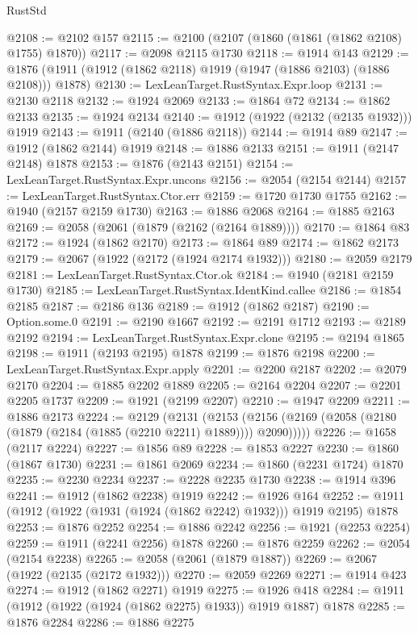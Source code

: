 \begin{lexlean}{RustStd}
\begin{coremodule}
@2108 := @2102 @157
@2115 := @2100 (@2107 (@1860 (@1861 (@1862 @2108) @1755) @1870))
@2117 := @2098 @2115 @1730
@2118 := @1914 @143
@2129 := @1876 (@1911 (@1912 (@1862 @2118) @1919 (@1947 (@1886 @2103) (@1886 @2108))) @1878)
@2130 := LexLeanTarget.RustSyntax.Expr.loop
@2131 := @2130 @2118
@2132 := @1924 @2069
@2133 := @1864 @72
@2134 := @1862 @2133
@2135 := @1924 @2134
@2140 := @1912 (@1922 (@2132 (@2135 @1932))) @1919
@2143 := @1911 (@2140 (@1886 @2118))
@2144 := @1914 @89
@2147 := @1912 (@1862 @2144) @1919
@2148 := @1886 @2133
@2151 := @1911 (@2147 @2148) @1878
@2153 := @1876 (@2143 @2151)
@2154 := LexLeanTarget.RustSyntax.Expr.uncons
@2156 := @2054 (@2154 @2144)
@2157 := LexLeanTarget.RustSyntax.Ctor.err
@2159 := @1720 @1730 @1755
@2162 := @1940 (@2157 @2159 @1730)
@2163 := @1886 @2068
@2164 := @1885 @2163
@2169 := @2058 (@2061 (@1879 (@2162 (@2164 @1889))))
@2170 := @1864 @83
@2172 := @1924 (@1862 @2170)
@2173 := @1864 @89
@2174 := @1862 @2173
@2179 := @2067 (@1922 (@2172 (@1924 @2174 @1932)))
@2180 := @2059 @2179
@2181 := LexLeanTarget.RustSyntax.Ctor.ok
@2184 := @1940 (@2181 @2159 @1730)
@2185 := LexLeanTarget.RustSyntax.IdentKind.callee
@2186 := @1854 @2185
@2187 := @2186 @136
@2189 := @1912 (@1862 @2187)
@2190 := Option.some.{0}
@2191 := @2190 @1667
@2192 := @2191 @1712
@2193 := @2189 @2192
@2194 := LexLeanTarget.RustSyntax.Expr.clone
@2195 := @2194 @1865
@2198 := @1911 (@2193 @2195) @1878
@2199 := @1876 @2198
@2200 := LexLeanTarget.RustSyntax.Expr.apply
@2201 := @2200 @2187
@2202 := @2079 @2170
@2204 := @1885 @2202 @1889
@2205 := @2164 @2204
@2207 := @2201 @2205 @1737
@2209 := @1921 (@2199 @2207)
@2210 := @1947 @2209
@2211 := @1886 @2173
@2224 := @2129
    (@2131
      (@2153 (@2156 (@2169 (@2058 (@2180 (@1879 (@2184 (@1885 (@2210 @2211) @1889)))) @2090)))))
@2226 := @1658 (@2117 @2224)
@2227 := @1856 @89
@2228 := @1853 @2227
@2230 := @1860 (@1867 @1730)
@2231 := @1861 @2069
@2234 := @1860 (@2231 @1724) @1870
@2235 := @2230 @2234
@2237 := @2228 @2235 @1730
@2238 := @1914 @396
@2241 := @1912 (@1862 @2238) @1919
@2242 := @1926 @164
@2252 := @1911 (@1912 (@1922 (@1931 (@1924 (@1862 @2242) @1932))) @1919 @2195) @1878
@2253 := @1876 @2252
@2254 := @1886 @2242
@2256 := @1921 (@2253 @2254)
@2259 := @1911 (@2241 @2256) @1878
@2260 := @1876 @2259
@2262 := @2054 (@2154 @2238)
@2265 := @2058 (@2061 (@1879 @1887))
@2269 := @2067 (@1922 (@2135 (@2172 @1932)))
@2270 := @2059 @2269
@2271 := @1914 @423
@2274 := @1912 (@1862 @2271) @1919
@2275 := @1926 @418
@2284 := @1911 (@1912 (@1922 (@1924 (@1862 @2275) @1933)) @1919 @1887) @1878
@2285 := @1876 @2284
@2286 := @1886 @2275

\end{coremodule}
\end{lexlean}
